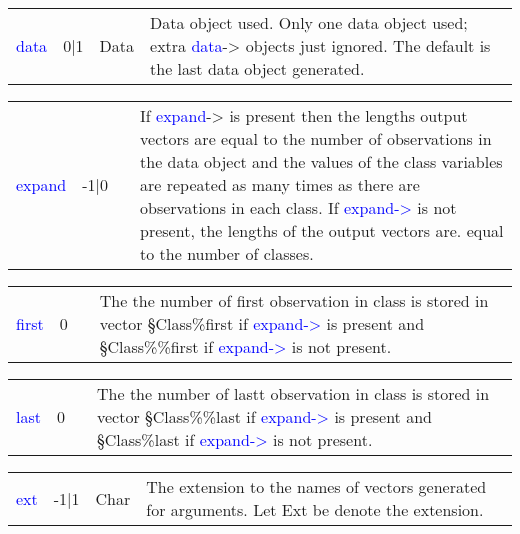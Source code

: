 \begin{table}[H]
\begin{tabular}{ m{}  m{}m{}p{}}
\textcolor{blue}{data}&0|1&Data&Data object used. Only one data object used; extra \textcolor{blue}{data}-> objects just ignored. The default is the last
 data object generated.
\\ \cline{1-4}
\end{tabular}
\end{table}
\vspace{-1.51em}
\begin{table}[H]
\begin{tabular}{ m{}  m{}m{}p{}}
\textcolor{blue}{expand}&-1|0& &If \textcolor{blue}{expand}-> is present then the lengths output vectors are equal
to the number of observations in the data object and the values of the class variables
 are repeated as many times as there are observations in each class. If
\textcolor{blue}{expand->} is not present, the lengths of the output vectors are.
 equal to the number of classes.
\\ \cline{1-4}
\end{tabular}
\end{table}
\vspace{-1.51em}
\begin{table}[H]
\begin{tabular}{ m{}  m{}m{}p{}}
\textcolor{blue}{first}&0& &The the number of first observation in class is stored in vector
 §Class\%first if \textcolor{blue}{expand->} is present and §Class\%\%first if \textcolor{blue}{expand->} is not present.
\\ \cline{1-4}
\end{tabular}
\end{table}
\vspace{-1.51em}
\begin{table}[H]
\begin{tabular}{ m{}  m{}m{}p{}}
\textcolor{blue}{last}&0& &The the number of lastt observation in class is stored in vector
 §Class\%\%last if \textcolor{blue}{expand->} is present and §Class\%last if \textcolor{blue}{expand->} is not present.
\\ \cline{1-4}
\end{tabular}
\end{table}
\vspace{-1.51em}
\begin{table}[H]
\begin{tabular}{ m{}  m{}m{}p{}}
\textcolor{blue}{ext}&-1|1&Char&The extension to the names of vectors generated for arguments. Let
 Ext be denote the extension.
\\ \cline{1-4}
\end{tabular}
\end{table}
